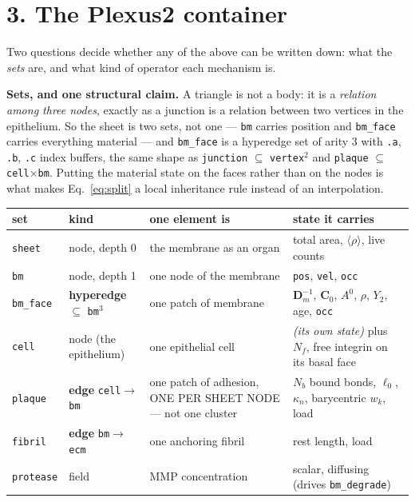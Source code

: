 \documentclass[10pt,a4paper]{article}
\newcommand{\code}[1]{\texttt{#1}}
\newcommand{\op}[1]{\texttt{#1}}
\begin{document}
\section*{3.\; The Plexus2 container}


Two questions decide whether any of the above can be written down: what the \emph{sets} are, and what
kind of operator each mechanism is.

\textbf{Sets, and one structural claim.} A triangle is not a body: it is a \emph{relation among three
nodes}, exactly as a junction is a relation between two vertices in the epithelium. So the sheet is two
sets, not one --- \code{bm} carries position and \code{bm\_face} carries everything material --- and
\code{bm\_face} is a hyperedge set of arity 3 with \code{.a}, \code{.b}, \code{.c} index buffers, the
same shape as \code{junction} $\subseteq$ \code{vertex}$^2$ and \code{plaque} $\subseteq$
\code{cell}$\times$\code{bm}. Putting the material state on the faces rather than on the nodes is what
makes Eq.~\eqref{eq:split} a local inheritance rule instead of an interpolation.

\begin{center}\small
\begin{tabularx}{\textwidth}{@{}p{2.0cm}p{3.4cm}p{3.6cm}L@{}}\toprule
\textbf{set} & \textbf{kind} & \textbf{one element is} & \textbf{state it carries}\\\midrule
\code{sheet}        & node, depth 0 & the membrane as an organ & total area, $\langle\rho\rangle$, live counts\\
\quad\code{bm}      & node, depth 1 & one node of the membrane & \code{pos}, \code{vel}, \code{occ}\\
\quad\code{bm\_face}& \textbf{hyperedge} $\subseteq$ \code{bm}$^3$ & one patch of membrane &
  $\mathbf D_m^{-1}$, $\mathbf C_0$, $A^0$, $\rho$, $Y_2$, age, \code{occ}\\\midrule
\code{cell}         & node (the epithelium) & one epithelial cell & \emph{(its own state)} plus
  $N_f$, free integrin on its basal face\\
\code{plaque}       & \textbf{edge} \code{cell}$\to$\code{bm} & one patch of adhesion, ONE PER SHEET
  NODE --- not one cluster & $N_b$ bound bonds, $\ell_0$, $\kappa_n$, barycentric $w_k$, load\\
\code{fibril}       & \textbf{edge} \code{bm}$\to$\code{ecm}  & one anchoring fibril & rest length, load\\
\midrule
\code{protease}     & field & MMP concentration & scalar, diffusing (drives \op{bm\_degrade})\\
\bottomrule
\end{tabularx}
\end{center}
\end{document}
